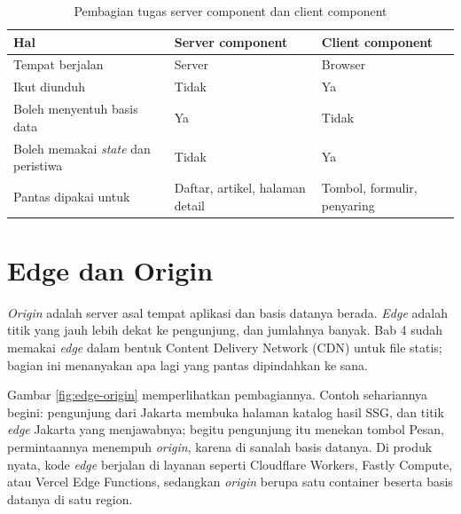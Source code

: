 \begin{table}[!htb]
  \centering
  \caption{Pembagian tugas server component dan client component}
  \label{tab:komponen}
  \begin{tabularx}{\textwidth}{lXX}
    \hline
    \textbf{Hal} & \textbf{Server component} & \textbf{Client component} \\
    \hline
    Tempat berjalan & Server & Browser \\
    \hline
    Ikut diunduh & Tidak & Ya \\
    \hline
    Boleh menyentuh basis data & Ya & Tidak \\
    \hline
    Boleh memakai \textit{state} dan peristiwa & Tidak & Ya \\
    \hline
    Pantas dipakai untuk & Daftar, artikel, halaman detail & Tombol, formulir, penyaring \\
    \hline
  \end{tabularx}
\end{table}

\section{Edge dan Origin}

\textit{Origin} adalah server asal tempat aplikasi dan basis datanya berada.
\textit{Edge} adalah titik yang jauh lebih dekat ke pengunjung, dan
jumlahnya banyak. Bab 4 sudah memakai \textit{edge} dalam bentuk Content Delivery Network (CDN) untuk
file statis; bagian ini menanyakan apa lagi yang pantas dipindahkan ke sana.

Gambar \ref{fig:edge-origin} memperlihatkan pembagiannya. Contoh
sehariannya begini: pengunjung dari Jakarta membuka halaman katalog hasil
SSG, dan titik \textit{edge} Jakarta yang menjawabnya; begitu pengunjung itu
menekan tombol Pesan, permintaannya menempuh \textit{origin}, karena di
sanalah basis datanya. Di produk nyata, kode \textit{edge} berjalan di
layanan seperti Cloudflare Workers, Fastly Compute, atau Vercel Edge
Functions, sedangkan \textit{origin} berupa satu container beserta basis
datanya di satu region.

